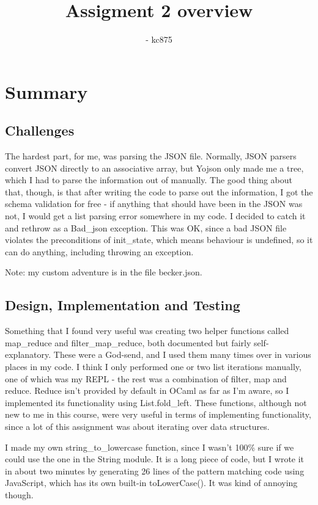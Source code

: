 

\title{Assigment 2 overview}
\author{\name - kc875}
\maketitle

\section{Summary}

\subsection{Challenges}
The hardest part, for me, was parsing the JSON file. Normally, JSON parsers convert JSON directly to an associative array, but Yojson only made me a tree, which I had to parse the information out of manually. The good thing about that, though, is that after writing the code to parse out the information, I got the schema validation for free - if anything that should have been in the JSON was not, I would get a list parsing error somewhere in my code. I decided to catch it and rethrow as a Bad\_json exception. This was OK, since a bad JSON file violates the preconditions of init\_state, which means behaviour is undefined, so it can do anything, including throwing an exception.

Note: my custom adventure is in the file becker.json.

\subsection{Design, Implementation and Testing}
Something that I found very useful was creating two helper functions called map\_reduce and filter\_map\_reduce, both documented but fairly self-explanatory. These were a God-send, and I used them many times over in various places in my code. I think I only performed one or two list iterations manually, one of which was my REPL - the rest was a combination of filter, map and reduce. Reduce isn't provided by default in OCaml as far as I'm aware, so I implemented its functionality using List.fold\_left. These functions, although not new to me in this course, were very useful in terms of implementing functionality, since a lot of this assignment was about iterating over data structures.

I made my own string\_to\_lowercase function, since I wasn't 100\% sure if we could use the one in the String module. It is a long piece of code, but I wrote it in about two minutes by generating 26 lines of the pattern matching code using JavaScript, which has its own built-in toLowerCase(). It was kind of annoying though.

